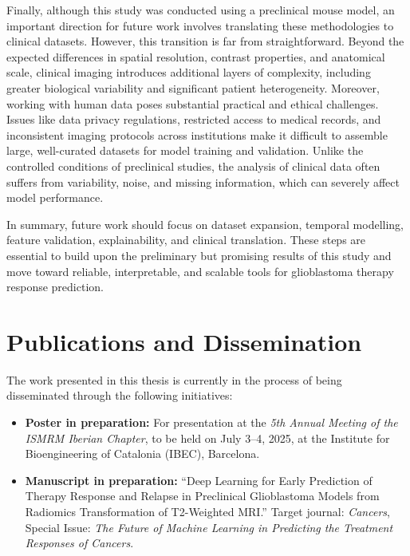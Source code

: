 \documentclass[12pt, a4paper]{report}
\begin{document}
Finally, although this study was conducted using a preclinical mouse model, an important direction for future work involves translating these methodologies to clinical datasets. However, this transition is far from straightforward. Beyond the expected differences in spatial resolution, contrast properties, and anatomical scale, clinical imaging introduces additional layers of complexity, including greater biological variability and significant patient heterogeneity.
%
Moreover, working with human data poses substantial practical and ethical challenges. Issues like data privacy regulations, restricted access to medical records, and inconsistent imaging protocols across institutions make it difficult to assemble large, well-curated datasets for model training and validation. Unlike the controlled conditions of preclinical studies, the analysis of clinical data often suffers from variability, noise, and missing information, which can severely affect model performance.

In summary, future work should focus on dataset expansion, temporal modelling, feature validation, explainability, and clinical translation. These steps are essential to build upon the preliminary but promising results of this study and move toward reliable, interpretable, and scalable tools for glioblastoma therapy response prediction.

\section*{Publications and Dissemination}

The work presented in this thesis is currently in the process of being disseminated through the following initiatives:

\begin{itemize}
    \item \textbf{Poster in preparation:} For presentation at the \textit{5th Annual Meeting of the ISMRM Iberian Chapter}, to be held on July 3--4, 2025, at the Institute for Bioengineering of Catalonia (IBEC), Barcelona.
    
    \item \textbf{Manuscript in preparation:} ``Deep Learning for Early Prediction of Therapy Response and Relapse in Preclinical Glioblastoma Models from Radiomics Transformation of T2-Weighted MRI.'' Target journal: \textit{Cancers}, Special Issue: \textit{The Future of Machine Learning in Predicting the Treatment Responses of Cancers}.
\end{itemize}


\newpage
\printbibliography
\end{document}
